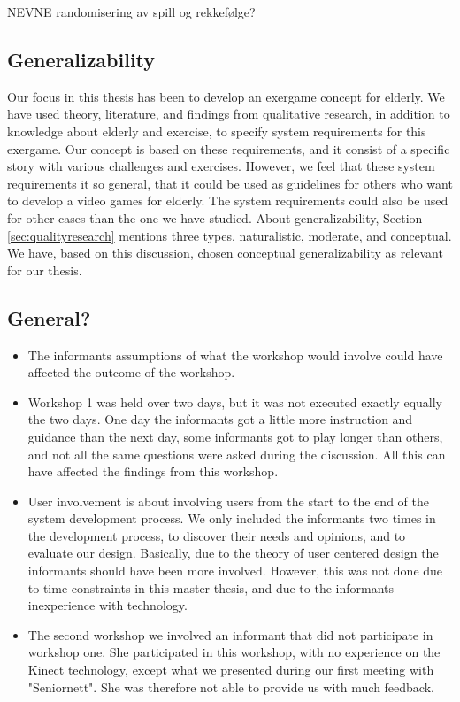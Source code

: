 NEVNE randomisering av spill og rekkefølge?
    
\subsection{Generalizability}    
Our focus in this thesis has been to develop an exergame concept for elderly. We have used theory, literature, and findings from qualitative research, in addition to knowledge about elderly and exercise, to specify system requirements for this exergame. Our concept is based on these requirements, and it consist of a specific story with various challenges and exercises. However, we feel that these system requirements it so general, that it could be used as guidelines for others who want to develop a video games for elderly. The system requirements could also be used for other cases than the one we have studied. About generalizability, Section \ref{sec:qualityresearch} mentions three types, naturalistic, moderate, and conceptual. We have, based on this discussion, chosen conceptual generalizability as relevant for our thesis.    

\subsection{General?}
\begin{itemize}
\renewcommand{\labelitemi}{$\bullet$}
\item The informants assumptions of what the workshop would involve could have affected the outcome of the workshop. 
\item Workshop 1 was held over two days, but it was not executed exactly equally the two days. One day the informants got a little more instruction and guidance than the next day, some informants got to play longer than others, and not all the same questions were asked during the discussion. All this can have affected the findings from this workshop. 
\item User involvement is about involving users from the start to the end of the system development process. We only included the informants two times in the development process, to discover their needs and opinions, and to evaluate our design. Basically, due to the theory of user centered design the informants should have been more involved. However, this was not done due to time constraints in this master thesis, and due to the informants inexperience with technology. 
\item The second workshop we involved an informant that did not participate in workshop one. She participated in this workshop, with no experience on the Kinect technology, except what we presented during our first meeting with "Seniornett". She was therefore not able to provide us with much feedback.
\end{itemize}


